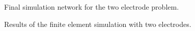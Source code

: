 \documentclass[fleqn,11pt,openany]{book}
\begin{document}
\begin{figure}
\caption{Final simulation network for the two electrode
problem.}\label{fig:network_5}
\end{figure}

\begin{figure}
\caption{Results of the finite element simulation with two
electrodes.}\label{fig:step_5_results_pre_vis_settings}
\end{figure}
\end{document}
